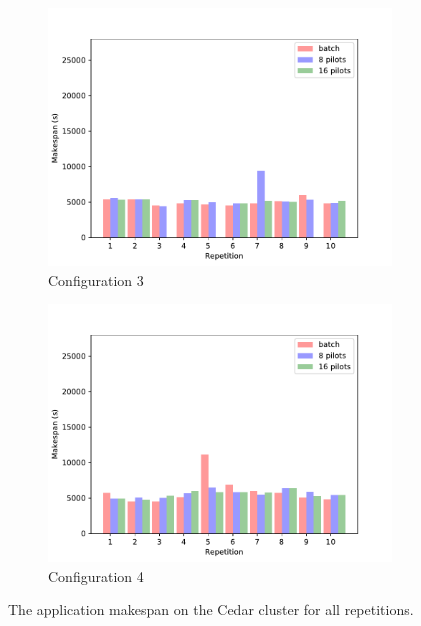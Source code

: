 \begin{figure}
\begin{subfigure}[b]{0.475\textwidth}
		\centering
		\includegraphics[width=\textwidth]{figures/spa/dedicated_3_cedar}
		\caption[]%
		{{\small Configuration 3}}
		\label{fig:cedar3}
	    \end{subfigure}
	    \quad
	    \begin{subfigure}[b]{0.475\textwidth}
		\centering
		\includegraphics[width=\textwidth]{figures/spa/dedicated_4_cedar}
		\caption[]%
		{{\small Configuration 4}}
		\label{fig:cedar4}
	    \end{subfigure}
	    \caption{\small The application makespan on the Cedar cluster for all repetitions.}
	    \label{fig:spa:makespanscedar}
	\end{figure}
    
